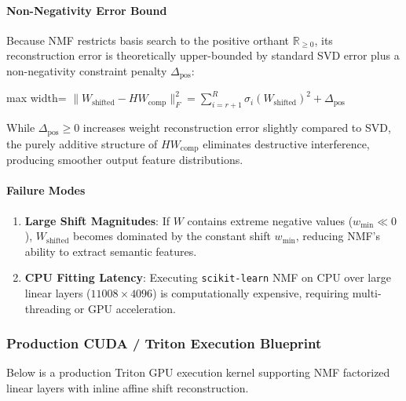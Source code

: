 \paragraph{Non-Negativity Error Bound}
Because NMF restricts basis search to the positive orthant $\mathbb{R}_{\ge 0}$, its reconstruction error is theoretically upper-bounded by standard SVD error plus a non-negativity constraint penalty $\Delta_{\text{pos}}$:

\begin{center}
\begin{adjustbox}{max width=\columnwidth}
$\displaystyle
\|W_{\text{shifted}} - H W_{\text{comp}}\|_F^2 = \sum_{i=r+1}^{R} \sigma_i(W_{\text{shifted}})^2 + \Delta_{\text{pos}}
$
\end{adjustbox}
\end{center}

While $\Delta_{\text{pos}} \ge 0$ increases weight reconstruction error slightly compared to SVD, the purely additive structure of $H W_{\text{comp}}$ eliminates destructive interference, producing smoother output feature distributions.

\paragraph{Failure Modes}
\begin{enumerate}
\item \textbf{Large Shift Magnitudes}: If $W$ contains extreme negative values ($w_{\min} \ll 0$), $W_{\text{shifted}}$ becomes dominated by the constant shift $w_{\min}$, reducing NMF's ability to extract semantic features.
\item \textbf{CPU Fitting Latency}: Executing \texttt{scikit-learn} NMF on CPU over large linear layers ($11008 \times 4096$) is computationally expensive, requiring multi-threading or GPU acceleration.


\end{enumerate}
\subsubsection*{Production CUDA / Triton Execution Blueprint}

Below is a production Triton GPU execution kernel supporting NMF factorized linear layers with inline affine shift reconstruction.

